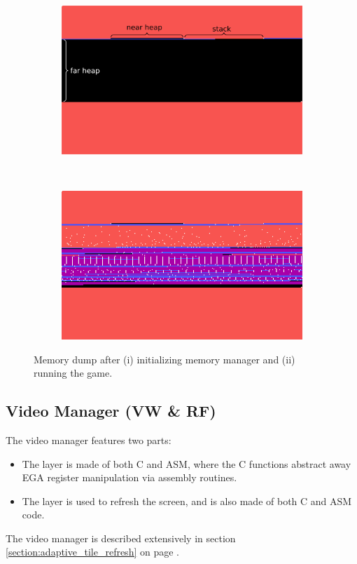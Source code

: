 \documentclass[book.tex]{subfiles}
\begin{document}
\begin{figure}[H]
	\centering
	\begin{subfigure}{1.0\linewidth}
		\includegraphics[width=\linewidth]{screenshots_300dpi/mm_dump_start_text.png}
	\end{subfigure}\\
	\vspace{3em}
	\begin{subfigure}{1.0\linewidth}
		\includegraphics[width=\linewidth]{screenshots_300dpi/mm_dump_run.png}
	\end{subfigure}
	\caption{Memory dump after (i) initializing memory manager and (ii) running the game.}
	\label{fig:subfigures}
\end{figure}


\subsection{Video Manager (VW \& RF)}
The video manager features two parts:
\begin{itemize}
\item The  layer is made of both C and ASM, where the C functions abstract away EGA register manipulation via assembly routines. 
\item The  layer is used to refresh the screen, and is also made of both C and ASM code.
\end{itemize}
The video manager is described extensively in section \ref{section:adaptive_tile_refresh} on page \pageref{section:adaptive_tile_refresh}.
\end{document}
